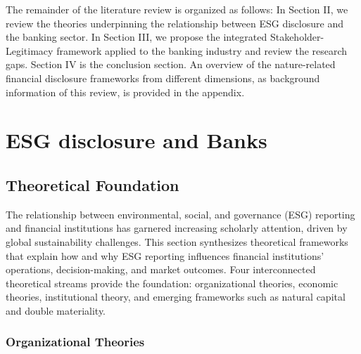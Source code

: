 \documentclass[
  authoryear]{elsarticle}
\begin{document}
The remainder of the literature review is organized as follows: In
Section II, we review the theories underpinning the relationship between
ESG disclosure and the banking sector. In Section III, we propose the
integrated Stakeholder-Legitimacy framework applied to the banking
industry and review the research gaps. Section IV is the conclusion
section. An overview of the nature-related financial disclosure
frameworks from different dimensions, as background information of this
review, is provided in the appendix.

\section{ESG disclosure and Banks}\label{esg-disclosure-and-banks}

\subsection{Theoretical Foundation}\label{theoretical-foundation}

The relationship between environmental, social, and governance (ESG)
reporting and financial institutions has garnered increasing scholarly
attention, driven by global sustainability challenges. This section
synthesizes theoretical frameworks that explain how and why ESG
reporting influences financial institutions' operations,
decision-making, and market outcomes. Four interconnected theoretical
streams provide the foundation: organizational theories, economic
theories, institutional theory, and emerging frameworks such as natural
capital and double materiality.

\subsubsection{Organizational Theories}\label{organizational-theories}
\end{document}
